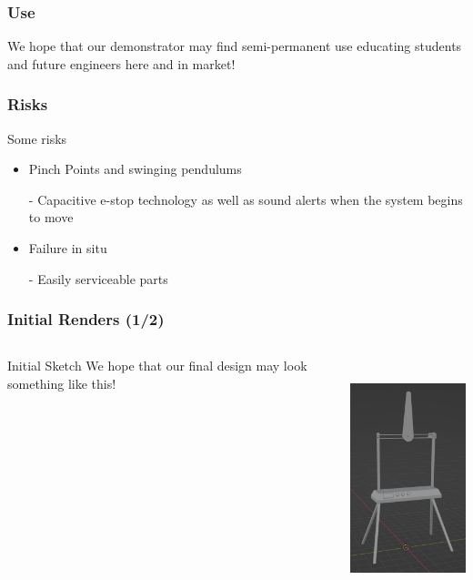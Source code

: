 \documentclass[aspectratio=169]{beamer}
\begin{document}
\begin{frame}
    \frametitle{Use}

    We hope that our demonstrator may find semi-permanent use educating students and future
    engineers here and in market!

\end{frame}


\begin{frame}
    \frametitle{Risks}

    Some risks

    \begin{itemize}
        \item Pinch Points and swinging pendulums
        \item [-] Capacitive e-stop technology as well as sound alerts when the system begins to move
        \item Failure in situ
        \item [-] Easily serviceable parts
    \end{itemize}

\end{frame}


\begin{frame}
    \frametitle{Initial Renders (1/2)}

    \begin{columns}                         %
        \begin{column}{0.48\textwidth}
            \begin{block}{Initial Sketch}
                We hope that our final design may look something like this!
            \end{block}
        \end{column}
        \begin{column}{0.48\textwidth}
            \includegraphics[height=7cm]{Full}
        \end{column}
    \end{columns}

\end{frame}
\end{document}
